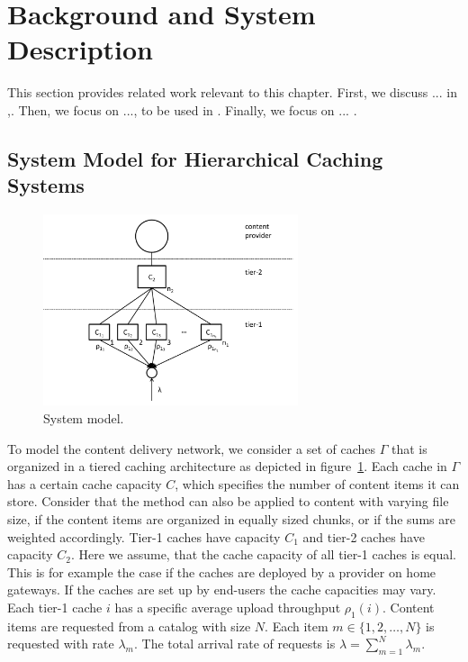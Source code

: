 \section{Background and System Description}\label{sec:hierarchical:related_work}
This section provides related work relevant to this chapter.
First, we discuss ... in ,.
Then, we focus on ..., to be used in .
Finally, we focus on ... .

\subsection{System Model for Hierarchical Caching Systems}

\begin{figure}[tb]
\centering
\includegraphics[width=75mm]{hierarchical/analyticbw/figures/hcmodeln1}
\caption{System model.}
\label{fig:hcmodel}
\end{figure}

To model the content delivery network, we consider a set of caches $\Gamma$ that is organized in a tiered caching architecture as depicted in figure~\ref{fig:hcmodel}. Each cache in $\Gamma$ has a certain cache capacity $C$, which specifies the number of content items it can store.
Consider that the method can also be applied to content with varying file size, if the content items are organized in equally sized chunks, or if the sums are weighted accordingly.
Tier-1 caches have capacity $C_1$ and tier-2 caches have capacity $C_2$.
Here we assume, that the cache capacity of all tier-1 caches is equal.
This is for example the case if the caches are deployed by a provider on home gateways.
If the caches are set up by end-users the cache capacities may vary.
Each tier-1 cache $i$ has a specific average upload throughput $\rho_1(i)$.
Content items are requested from a catalog with size $N$.
Each item $m\in \{1,2,\dots,N\}$ is requested with rate $\lambda_m$.
The total arrival rate of requests is $\lambda=\sum_{m=1}^N \lambda_m$.

